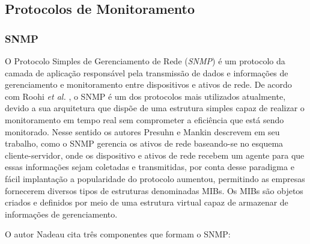 
\subsection{Protocolos de Monitoramento}


\subsubsection{SNMP}

O Protocolo Simples de Gerenciamento de Rede (\textit{\acrlong{SNMP}}) é um protocolo da camada de aplicação responsável pela transmissão de dados e informações de gerenciamento e monitoramento entre dispositivos e ativos de rede. De acordo com Roohi \textit{et al.} \cite{roohi2014application}, o \acrshort{SNMP} é um dos protocolos mais utilizados atualmente, devido a sua arquitetura que dispõe de uma estrutura simples capaz de realizar o monitoramento em tempo real sem comprometer a eficiência que está sendo monitorado. Nesse sentido os autores Presuhn e Mankin \cite{roohi2014application,presuhn2002management} descrevem  em seu trabalho, como o \acrshort{SNMP} gerencia os ativos de rede baseando-se no esquema cliente-servidor, onde os dispositivo e ativos de rede recebem um agente para que essas informações sejam coletadas e transmitidas, por conta desse paradigma e fácil implantação a popularidade do protocolo aumentou, permitindo as empresas fornecerem diversos tipos de estruturas denominadas \acrshort{MIBs}. Os \acrshort{MIBs} são objetos criados e definidos por meio de uma estrutura virtual capaz de armazenar de informações de gerenciamento.

O autor Nadeau\cite{nadeau2003mpls} cita três componentes que formam o \acrshort{SNMP}:  

